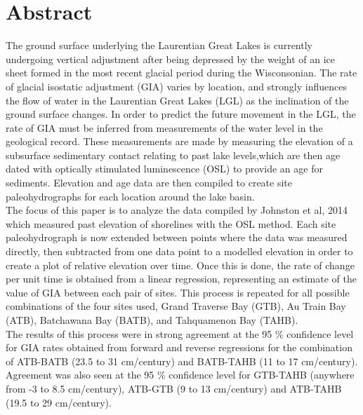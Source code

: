 


\newcommand{\result}[1]{%
    \dtlgetrowforvalue{result}{\dtlcolumnindex{result}{id}}{#1}%
}


\section{Abstract}

The ground surface underlying the Laurentian Great Lakes is currently undergoing vertical adjustment
 after being depressed by the weight of an ice sheet formed in the most recent glacial period during the Wisconsonian.
 The rate of glacial isostatic adjustment (GIA) varies by location, and strongly influences the flow of water
 in the Laurentian Great Lakes (LGL) as the inclination of the ground surface changes. In order to predict the
 future movement in the LGL, the rate of GIA must be
 inferred from measurements of the water level in the geological record. These measurements are
 made by measuring the elevation of a subsurface sedimentary contact relating to
 past lake levels,which are then age dated with optically stimulated luminescence
 (OSL) to provide an age for sediments. Elevation and age data are then compiled
 to create site paleohydrographs for each location around the lake basin.\\
 
 The focus of this paper is to analyze the data compiled by Johnston et al, 2014
 which measured past elevation of shorelines with the OSL method. Each site paleohydrograph
 is now extended between points where the data was measured directly, then subtracted
 from one data point to a modelled elevation in order to create a
 plot of relative elevation over time. Once this is done, the rate of change per unit
 time is obtained from a linear regression, representing an estimate of the value
 of GIA between each pair of sites. This process is repeated for
 all possible combinations of the four sites used, 
 Grand Traverse Bay (GTB), Au Train Bay (ATB), Batchawana Bay (BATB), and Tahquamenon Bay (TAHB).\\
 
 The results of this process were in strong agreement at the 95 \% confidence level for GIA rates obtained from
 forward and reverse regressions for the combination of ATB-BATB (23.5 to 31 cm/century) and
 BATB-TAHB (11 to 17 cm/century). Agreement was also seen at the 95 \% confidence level for GTB-TAHB (anywhere from -3 to 8.5 cm/century),
 ATB-GTB (9 to 13 cm/century) and ATB-TAHB (19.5 to 29 cm/century).
